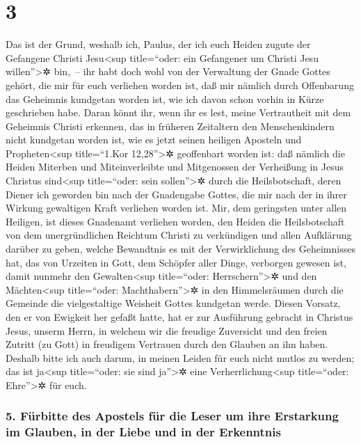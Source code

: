 \hypertarget{section-2}{%
\section{3}\label{section-2}}

 Das ist der Grund, weshalb ich, Paulus, der ich euch
Heiden zugute der Gefangene Christi Jesu\textless sup title=``oder: ein
Gefangener um Christi Jesu willen''\textgreater✲ bin,~-- 
ihr habt doch wohl von der Verwaltung der Gnade Gottes gehört, die mir
für euch verliehen worden ist,  daß mir nämlich durch
Offenbarung das Geheimnis kundgetan worden ist, wie ich davon schon
vorhin in Kürze geschrieben habe.  Daran könnt ihr, wenn
ihr es lest, meine Vertrautheit mit dem Geheimnis Christi erkennen,
 das in früheren Zeitaltern den Menschenkindern nicht
kundgetan worden ist, wie es jetzt seinen heiligen Aposteln und
Propheten\textless sup title=``1.Kor 12,28''\textgreater✲ geoffenbart
worden ist:  daß nämlich die Heiden Miterben und
Miteinverleibte und Mitgenossen der Verheißung in Jesus Christus
sind\textless sup title=``oder: sein sollen''\textgreater✲ durch die
Heilsbotschaft,  deren Diener ich geworden bin nach der
Gnadengabe Gottes, die mir nach der in ihrer Wirkung gewaltigen Kraft
verliehen worden ist.  Mir, dem geringsten unter allen
Heiligen, ist dieses Gnadenamt verliehen worden, den Heiden die
Heilsbotschaft von dem unergründlichen Reichtum Christi zu verkündigen
 und allen Aufklärung darüber zu geben, welche Bewandtnis
es mit der Verwirklichung des Geheimnisses hat, das von Urzeiten in
Gott, dem Schöpfer aller Dinge, verborgen gewesen ist, 
damit nunmehr den Gewalten\textless sup title=``oder:
Herrschern''\textgreater✲ und den Mächten\textless sup title=``oder:
Machthabern''\textgreater✲ in den Himmelsräumen durch die Gemeinde die
vielgestaltige Weisheit Gottes kundgetan werde.  Diesen
Vorsatz, den er von Ewigkeit her gefaßt hatte, hat er zur Ausführung
gebracht in Christus Jesus, unserm Herrn,  in welchem wir
die freudige Zuversicht und den freien Zutritt (zu Gott) in freudigem
Vertrauen durch den Glauben an ihn haben.  Deshalb bitte
ich auch darum, in meinen Leiden für euch nicht mutlos zu werden; das
ist ja\textless sup title=``oder: sie sind ja''\textgreater✲ eine
Verherrlichung\textless sup title=``oder: Ehre''\textgreater✲ für euch.

\hypertarget{fuxfcrbitte-des-apostels-fuxfcr-die-leser-um-ihre-erstarkung-im-glauben-in-der-liebe-und-in-der-erkenntnis}{%
\subsubsection{5. Fürbitte des Apostels für die Leser um ihre Erstarkung
im Glauben, in der Liebe und in der
Erkenntnis}\label{fuxfcrbitte-des-apostels-fuxfcr-die-leser-um-ihre-erstarkung-im-glauben-in-der-liebe-und-in-der-erkenntnis}}

